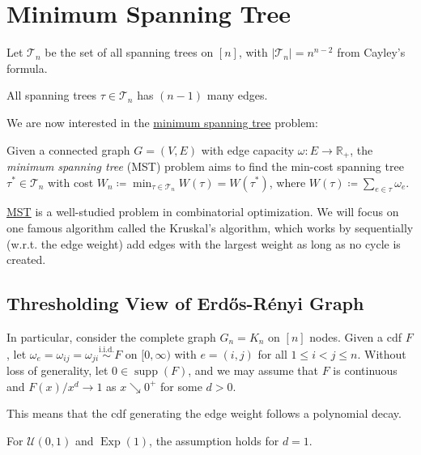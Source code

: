 \section{Minimum Spanning Tree}
Let \(\mathcal{T} _n\) be the set of all spanning trees on \([n]\), with \(\lvert \mathcal{T} _n \rvert = n^{n-2}\) from Cayley's formula.

\begin{note}
	All spanning trees \(\tau \in \mathcal{T} _n\) has \((n-1)\) many edges.
\end{note}

We are now interested in the \hyperref[prb:MST]{minimum spanning tree} problem:

\begin{problem}\label{prb:MST}
Given a connected graph \(G=(V, E)\) with edge capacity \(\omega \colon E \to \mathbb{R} _{+} \), the \emph{minimum spanning tree} (MST) problem aims to find the min-cost spanning tree \(\tau ^{\ast} \in \mathcal{T} _n\) with cost \(W_n \coloneqq \min _{\tau \in \mathcal{T} _n} W(\tau ) = W(\tau ^{\ast} )\), where \(W(\tau ) \coloneqq \sum_{e \in \tau } \omega _e \).
\end{problem}

\hyperref[prb:MST]{MST} is a well-studied problem in combinatorial optimization. We will focus on one famous algorithm called the Kruskal's algorithm, which works by sequentially (w.r.t. the edge weight) add edges with the largest weight as long as no cycle is created.

\subsection{Thresholding View of Erdős-Rényi Graph}
In particular, consider the complete graph \(G_n = K_n\) on \([n]\) nodes. Given a cdf \(F\), let \(\omega _e = \omega _{ij} = \omega _{ji} \overset{\text{i.i.d.} }{\sim } F\) on \([0, \infty )\) with \(e = (i, j)\) for all \(1 \leq i < j \leq n\). Without loss of generality, let \(0 \in \operatorname{supp}(F) \), and we may assume that \(F\) is continuous and \(F(x) / x^d \to 1\) as \(x \searrow 0^+\) for some \(d > 0\).

\begin{intuition}
	This means that the cdf generating the edge weight follows a polynomial decay.
\end{intuition}

\begin{eg}
	For \(\mathcal{U} (0, 1)\) and \(\operatorname{Exp}(1) \), the assumption holds for \(d=1\).
\end{eg}

